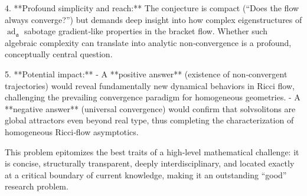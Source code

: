 4. **Profound simplicity and reach:**  
   The conjecture is compact (“Does the flow always converge?”) but demands deep insight into how complex eigenstructures of \( \operatorname{ad}_{\mathfrak{a}} \) sabotage gradient‑like properties in the bracket flow. Whether such algebraic complexity can translate into analytic non‑convergence is a profound, conceptually central question.

5. **Potential impact:**  
   - A **positive answer** (existence of non‑convergent trajectories) would reveal fundamentally new dynamical behaviors in Ricci flow, challenging the prevailing convergence paradigm for homogeneous geometries.  
   - A **negative answer** (universal convergence) would confirm that solvsolitons are global attractors even beyond real type, thus completing the characterization of homogeneous Ricci‑flow asymptotics.

This problem epitomizes the best traits of a high‑level mathematical challenge: it is concise, structurally transparent, deeply interdisciplinary, and located exactly at a critical boundary of current knowledge, making it an outstanding “good” research problem.